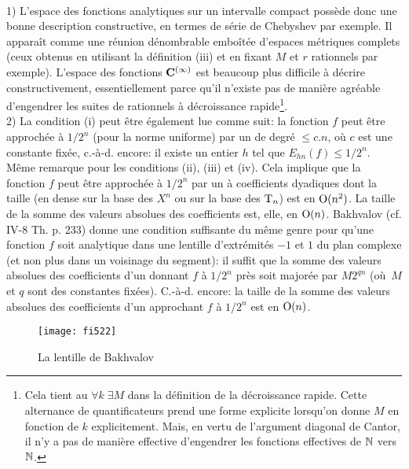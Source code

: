 \begin{fremarks}\label{frem-anal} ~\\
1) L'espace des fonctions analytiques sur un intervalle compact possède donc 
une bonne description constructive, en termes de série de Chebyshev par 
exemple.  Il apparaît comme une réunion dénombrable emboîtée 
d'espaces métriques complets  (ceux obtenus en utilisant la définition  
(iii)  et en fixant  $M$  et  $r$  rationnels par exemple).  
L'espace des fonctions  ${\bf C}^{(\infty)}$  est beaucoup plus difficile à décrire 
constructivement, essentiellement parce qu'il n'existe pas de manière 
agréable d'engendrer les suites de rationnels à 
décroissance rapide{\footnote{Cela tient au  $\forall k  \; \exists M $  dans 
la définition de la décroissance rapide.  
Cette alternance de quantificateurs prend une forme explicite lorsqu'on donne  
$M$  en fonction de  $k$  explicitement.  Mais, en vertu de l'argument diagonal 
de Cantor, il n'y a pas de manière effective d'engendrer les fonctions 
effectives de $\mathbb {N}$   vers $\mathbb {N}$.}}. \\
2) La condition  (i)  peut être également lue comme suit:  
la fonction $f$ peut être approchée à  $1/2^n$  (pour la norme uniforme)  
par un \pol de degré $\leq  c.n$,  où  $c$  est une constante 
fixée,  c.-à-d. encore: il existe un entier $h$ tel que
  $E_{hn}(f) \leq 1/2^n$. \\
   Même remarque pour les conditions  (ii),  (iii)  et  (iv). Cela implique 
que la fonction $f$ peut être approchée à  $1/2^n$  par un \pol à 
coefficients dyadiques dont la taille (en \pres dense sur la base des  $X^n$  ou 
sur la base des  ${\rm T}_n$)  est   en  ${\rm O}(n^2)$.  La taille de la somme des 
valeurs absolues des coefficients est, elle, en  ${\rm O}(n)$.    
Bakhvalov  (cf.  \cite {fBa}  IV-8  Th. p. 233)  donne une condition 
suffisante du même genre pour qu'une fonction $f$ soit analytique dans une 
lentille d'extrémités   $-1$  et  $1$  du plan complexe  (et non plus dans 
un voisinage du segment):  il suffit que la somme des valeurs absolues des 
coefficients d'un \pol donnant $f$ à  $1/2^n$  près soit majorée par  
$M2^{qn}$  (où~$M$ et $q$  sont des constantes fixées). C.-à-d. encore: 
la taille de la somme des valeurs absolues des coefficients d'un \pol 
approchant $f$ à  $1/2^n$  est en  ${\rm O}(n)$.
\begin{figure}[htbp]  
\begin{center}
\texttt{[image: fi522]}
\end{center}
\caption[La lentille de Bakhvalov]{\label{ffi522}  
La lentille de Bakhvalov}  
\end{figure}  

\end{fremarks}



